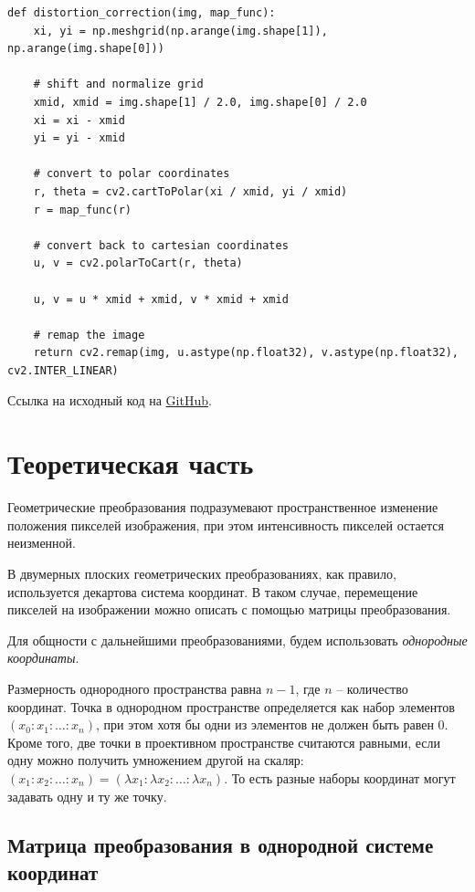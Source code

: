 \begin{lstlisting}[caption={Функция для коррекции дисторсии}]
def distortion_correction(img, map_func):
    xi, yi = np.meshgrid(np.arange(img.shape[1]), np.arange(img.shape[0]))

    # shift and normalize grid 
    xmid, xmid = img.shape[1] / 2.0, img.shape[0] / 2.0
    xi = xi - xmid
    yi = yi - xmid

    # convert to polar coordinates
    r, theta = cv2.cartToPolar(xi / xmid, yi / xmid)
    r = map_func(r)

    # convert back to cartesian coordinates
    u, v = cv2.polarToCart(r, theta)

    u, v = u * xmid + xmid, v * xmid + xmid

    # remap the image
    return cv2.remap(img, u.astype(np.float32), v.astype(np.float32), cv2.INTER_LINEAR)
\end{lstlisting}

Ссылка на исходный код на \href{https://github.com/edelwiw/TechVision_Lab2}{GitHub}. 

\section{Теоретическая часть}

Геометрические преобразования подразумевают пространственное изменение положения 
пикселей изображения, при этом интенсивность пикселей остается неизменной.

В двумерных плоских геометрических преобразованиях, как правило, используется декартова система координат.
В таком случае, перемещение пикселей на изображении можно описать с помощью матрицы преобразования.

Для общности с дальнейшими преобразованиями, будем использовать \textit{однородные координаты}.

Размерность однородного пространства равна $n - 1$, где $n$ -- количество координат.
Точка в однородном пространстве определяется как набор элементов $\left(x_0:x_1:\ldots:x_n\right)$, при этом хотя бы одни из элементов не должен быть равен 0. 
Кроме того, две точки в проективном пространстве считаются равными, если одну можно получить умножением другой на скаляр: $\left(x_1:x_2:\ldots:x_n\right)=\left(\lambda x_1:\lambda x_2:\ldots:\lambda x_n\right)$. То есть разные наборы координат могут задавать одну и ту же точку.   

\subsection{Матрица преобразования в однородной системе координат}

